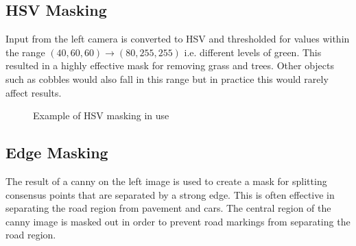 \documentclass[10pt]{article}
\begin{document}
\newpage

\subsection *{HSV Masking}
    Input from the left camera is converted to HSV and thresholded for values within the range $(40,60,60) \rightarrow (80,255,255)$ i.e. different levels of green. This resulted in a highly effective mask for removing grass and trees. Other objects such as cobbles would also fall in this range but in practice this would rarely affect results.

    \begin{figure}[!h]
        \centering
        \hfill
        \hfill
        \hfill

        \caption{Example of HSV masking in use}
    \end{figure}

\subsection *{Edge Masking}
    The result of a canny on the left image is used to create a mask for splitting consensus points that are separated by a strong edge. This is often effective in separating the road region from pavement and cars. The central region of the canny image is masked out in order to prevent road markings from separating the road region.
\end{document}
